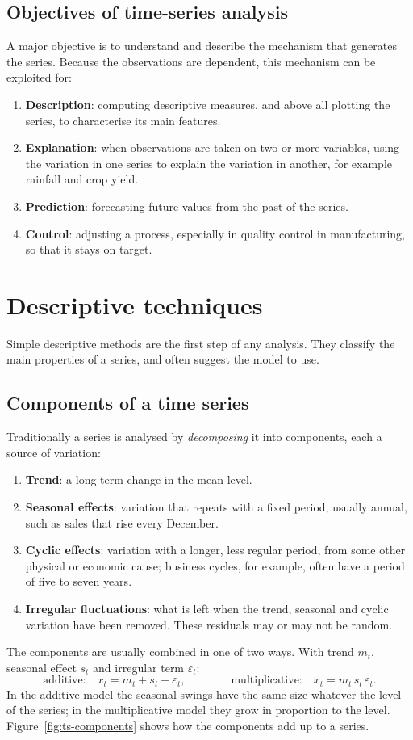 \documentclass[11pt,a4paper]{article}
\theoremstyle{definition}
\begin{document}
\subsection{Objectives of time-series analysis}
A major objective is to understand and describe the mechanism that generates the series. Because the
observations are dependent, this mechanism can be exploited for:
\begin{enumerate}
\item \textbf{Description}: computing descriptive measures, and above all plotting the series, to characterise its
main features.
\item \textbf{Explanation}: when observations are taken on two or more variables, using the variation in one
series to explain the variation in another, for example rainfall and crop yield.
\item \textbf{Prediction}: forecasting future values from the past of the series.
\item \textbf{Control}: adjusting a process, especially in quality control in manufacturing, so that it stays on
target.
\end{enumerate}

\section{Descriptive techniques}
Simple descriptive methods are the first step of any analysis. They classify the main properties of a series,
and often suggest the model to use.

\subsection{Components of a time series}
Traditionally a series is analysed by \emph{decomposing} it into components, each a source of variation:
\begin{enumerate}
\item \textbf{Trend}: a long-term change in the mean level.
\item \textbf{Seasonal effects}: variation that repeats with a fixed period, usually annual, such as sales that
rise every December.
\item \textbf{Cyclic effects}: variation with a longer, less regular period, from some other physical or economic
cause; business cycles, for example, often have a period of five to seven years.
\item \textbf{Irregular fluctuations}: what is left when the trend, seasonal and cyclic variation have been
removed. These residuals may or may not be random.
\end{enumerate}
The components are usually combined in one of two ways. With trend $m_t$, seasonal effect $s_t$ and irregular term
$\varepsilon_t$:
\[
\text{additive:}\quad x_t = m_t + s_t + \varepsilon_t , \qquad\qquad \text{multiplicative:}\quad x_t = m_t\,s_t\,\varepsilon_t .
\]
In the additive model the seasonal swings have the same size whatever the level of the series; in the
multiplicative model they grow in proportion to the level. Figure~\ref{fig:ts-components} shows how the
components add up to a series.
\end{document}
